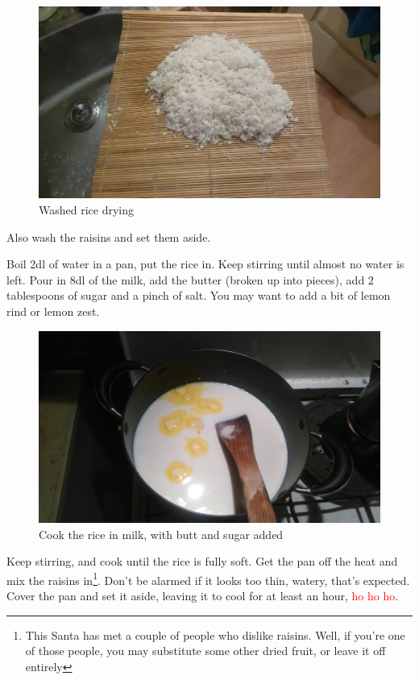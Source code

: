 \documentclass{article}
\begin{document}
\begin{figure}[!htbp]
\includegraphics[width=\textwidth]{rizskoch_02}
\caption{Washed rice drying}
\end{figure}

Also wash the raisins and set them aside.

Boil 2dl of water in a pan, put the rice in. Keep stirring until almost no water is left. Pour in 8dl of the milk, add the butter (broken up into pieces), add 2 tablespoons of sugar and a pinch of salt. You may want to add a bit of lemon rind or lemon zest.

\begin{figure}[!htbp]
\includegraphics[width=\textwidth]{rizskoch_04}
\caption{Cook the rice in milk, with butt and sugar added}
\end{figure}

Keep stirring, and cook until the rice is fully soft. Get the pan off the heat and mix the raisins in\footnote{This Santa has met a couple of people who dislike raisins. Well, if you're one of those people, you may substitute some other dried fruit, or leave it off entirely}. Don't be alarmed if it looks too thin, watery, that's expected. Cover the pan and set it aside, leaving it to cool for at least an hour, \textcolor{red}{ho ho ho}.
\end{document}

